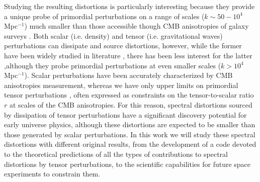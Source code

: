 Studying the resulting distortions is particularly interesting because they provide a unique probe of primordial perturbations on a range of scales ($k\sim50-10^{4}$ Mpc$^{-1}$) much smaller than those accessible though CMB anisotropies of galaxy surveys \cite{chlubafuturestepscosmologyusing}. Both scalar (i.e. density) and tensor (i.e. gravitational waves) perturbations can dissipate and source distortions, however, while the former have been widely studied in literature \cite{Lucca_2020,Chluba_2x2}, there has been less interest for the latter \cite{Chluba_tens_diss},although they probe primordial perturbations at even smaller scales ($k>10^{4}$ Mpc$^{-1}$). Scalar perturbations have been accurately characterized by CMB anisotropies measurement, whereas we have only upper limits on primordial tensor perturbations \cite{Ade_2021,planck2018results}, often expressed as constraints on the tensor-to-scalar ratio $r$ at scales of the CMB anisotropies. For this reason, spectral distortions sourced by dissipation of tensor perturbations have a significant discovery potential for early universe physics, although these distortions are expected to be smaller than those generated by scalar perturbations. In this work we will study these spectral distortions with different original results, from the development of a code devoted to the theoretical predictions of all the types of contributions to spectral distortions by tensor perturbations, to the scientific capabilities for future space experiments to constrain them.

